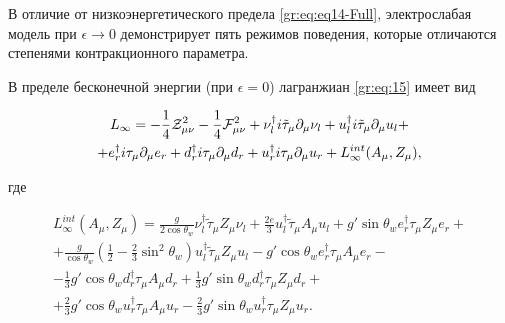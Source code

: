 В отличие от низкоэнергетического предела  \eqref{gr:eq:eq14-Full}, электрослабая модель при $\epsilon \rightarrow 0$ демонстрирует пять режимов поведения, которые отличаются степенями контракционного параметра.

В пределе бесконечной энергии   (при $\epsilon =0$) лагранжиан \eqref{gr:eq:15} имеет вид

\begin{multline}

L_{\infty}= - \frac{1}{4}{\cal Z}_{\mu\nu}^2 - \frac{1}{4}{\cal F}_{\mu\nu}^2 +

\nu_l^{\dagger}i\tilde{\tau}_{\mu}\partial_{\mu}\nu_l

+u_{l}^{\dagger}i\tilde{\tau}_{\mu}\partial_{\mu}u_{l}+

\\

+e_r^{\dagger}i\tau_{\mu}\partial_{\mu}e_r +

d_r^{\dagger}i\tau_{\mu}\partial_{\mu}d_r

+u_r^{\dagger}i\tau_{\mu}\partial_{\mu}u_r + L_{\infty}^{int}(A_{\mu},Z_{\mu}),

\label{gr:eq:15-dop}

\end{multline}

где 

\begin{multline}

L_{\infty}^{int}(A_{\mu},Z_{\mu})= \frac{g}{2\cos \theta_w} \nu_l^{\dagger}\tilde{\tau}_{\mu}Z_{\mu}\nu_l

+\frac{2e}{3}u_{l}^{\dagger}\tilde{\tau}_{\mu}A_{\mu}u_{l}

+g'\sin \theta_w e_r^{\dagger}\tau_{\mu}Z_{\mu}e_r +

\\

+\frac{g}{\cos \theta_w}\left(\frac{1}{2}-\frac{2}{3}\sin^2\theta_w\right) u_{l}^{\dagger}\tilde{\tau}_{\mu}Z_{\mu}u_{l} 

 - g'\cos \theta_w e_r^{\dagger}\tau_{\mu}A_{\mu}e_r-

\\

-\frac{1}{3}g'\cos\theta_w d_r^{\dagger}\tau_{\mu}A_{\mu}d_r + \frac{1}{3}g'\sin\theta_w d_r^{\dagger}\tau_{\mu}Z_{\mu}d_r +

\\

 + \frac{2}{3}g'\cos\theta_w u_r^{\dagger}\tau_{\mu}A_{\mu}u_r

-\frac{2}{3}g'\sin\theta_w u_r^{\dagger}\tau_{\mu}Z_{\mu}u_r.

\label{gr:eq:14}

\end{multline}

